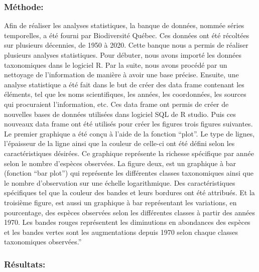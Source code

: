\documentclass[9pt,twocolumn,twoside,]{pnas-new}
\begin{document}
\subsubsection{Méthode:}\label{muxe9thode}

Afin de réaliser les analyses statistiques, la banque de données, nommée
séries temporelles, a été fourni par Biodiversité Québec. Ces données
ont été récoltées sur plusieurs décennies, de 1950 à 2020. Cette banque
nous a permis de réaliser plusieurs analyses statistiques. Pour débuter,
nous avons importé les données taxonomiques dans le logiciel R. Par la
suite, nous avons procédé par un nettoyage de l'information de manière à
avoir une base précise. Ensuite, une analyse statistique a été fait dans
le but de créer des data frame contenant les éléments, tel que les noms
scientifiques, les années, les coordonnées, les sources qui procuraient
l'information, etc. Ces data frame ont permis de créer de nouvelles
bases de données utilisées dans logiciel SQL de R studio. Puis ces
nouveaux data frame ont été utilisés pour créer les figures trois
figures suivantes. Le premier graphique a été conçu à l'aide de la
fonction ``plot''. Le type de lignes, l'épaisseur de la ligne ainsi que
la couleur de celle-ci ont été défini selon les caractéristiques
désirées. Ce graphique représente la richesse spécifique par année selon
le nombre d'espèces observées. La figure deux, est un graphique à bar
(fonction ``bar plot'') qui représente les différentes classes
taxonomiques ainsi que le nombre d'observation sur une échelle
logarithmique. Des caractéristiques spécifiques tel que la couleur des
bandes et leurs bordures ont été attribués. Et la troisième figure, est
aussi un graphique à bar représentant les variations, en pourcentage,
des espèces observées selon les différentes classes à partir des années
1970. Les bandes rouges représentent les diminutions en abondances des
espèces et les bandes vertes sont les augmentations depuis 1970 selon
chaque classes taxonomiques observées.''

\subsubsection{Résultats:}\label{ruxe9sultats}
\end{document}
